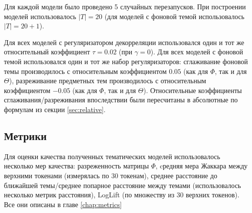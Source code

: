 Для каждой модели было проведено 5 случайных перезапусков. При построении моделей использовалось $|T|= 20$ (для моделей с фоновой темой использовалось $|T|= 20+1$).

Для всех моделей с регуляризатором декорреляции использовался один и тот же относительный коэффициент $\tau = 0.02$ (при $\gamma=0$). Для всех моделей с фоновой темой использовался один и тот же набор регуляризаторов: сглаживание фоновой темы производилось с относительным коэффициентом $0.05$ (как для $\Phi$, так и для $\Theta$), разреживание предметных тем производилось  с относительным коэффициентом $-0.05$ (как для $\Phi$, так и для $\Theta$). Относительные коэффициенты сглаживания/разреживания впоследствии были пересчитаны в абсолютные по формулам из секции \ref{sec:relative}.

\subsection{Метрики}

Для оценки качества полученных тематических моделей использовалось несколько мер качества: разреженность матрицы $\Phi$, cредняя мера Жаккара между верхними токенами (измерялась по 30 токенам), среднее расстояние до ближайшей темы/среднее попарное расстояние между темами (использовалось несколько метрик расстояния), LogLift (по множеству из 30 верхних токенов). Все они описаны в главе \ref{chap:metrics}

